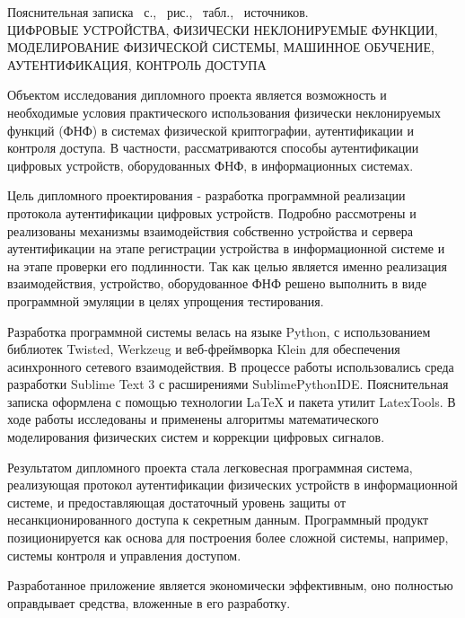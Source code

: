 
\begin{center}
    Пояснительная записка \pageref*{LastPage}~с., \totfig{}~рис., \tottab{}~табл., \totref{}~источников.
    \\
    \MakeUppercase{цифровые устройства, физически неклонируемые функции, моделирование физической системы, машинное обучение, аутентификация, контроль доступа}
\end{center}

Объектом исследования дипломного проекта является возможность и необходимые условия практического использования физически неклонируемых функций (ФНФ) в системах физической криптографии, аутентификации и контроля доступа. В частности, рассматриваются способы аутентификации цифровых устройств, оборудованных ФНФ, в информационных системах.

Цель дипломного проектирования - разработка программной реализации протокола аутентификации цифровых устройств. Подробно рассмотрены и реализованы механизмы взаимодействия собственно устройства и сервера аутентификации на этапе регистрации устройства в информационной системе и на этапе проверки его подлинности.
Так как целью является именно реализация взаимодействия, устройство, оборудованное ФНФ решено выполнить в виде программной эмуляции в целях упрощения тестирования.

Разработка программной системы велась на языке Python, с использованием библиотек Twisted, Werkzeug и веб-фреймворка Klein для обеспечения асинхронного сетевого взаимодействия. В процессе работы использовались среда разработки Sublime Text 3 с расширениями SublimePythonIDE. Пояснительная записка оформлена с помощью технологии LaTeX и пакета утилит LatexTools. В ходе работы исследованы и применены алгоритмы математического моделирования физических систем и коррекции цифровых сигналов.

Результатом дипломного проекта стала легковесная программная система, реализующая протокол аутентификации физических устройств в информационной системе, и предоставляющая достаточный уровень защиты от несанкционированного доступа к секретным данным. Программный продукт позиционируется как основа для построения более сложной системы, например, системы контроля и управления доступом.

Разработанное приложение является экономически эффективным, оно полностью оправдывает средства, вложенные в его разработку.

